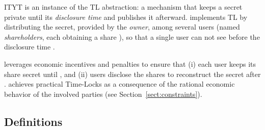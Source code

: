 %
%






ITYT is an instance of the TL abstraction: a mechanism that keeps a secret \secret private until its {\em disclosure time} \td and publishes it afterward.
%
\shortname implements TL by distributing the secret, provided by the {\em owner}, among several users (named {\em shareholders}, each obtaining a share \share), so that a single user can not see  \secret before the disclosure time \td.

\shortname leverages economic incentives and penalties to ensure that (i) each user keeps its share secret until \td, and (ii) users disclose the shares to reconstruct the secret after \td.
%
%
%
\shortname achieves practical Time-Locks as a consequence of the rational economic behavior of the involved parties
(see Section~\ref{sect:constraints}).

\subsection{Definitions}

